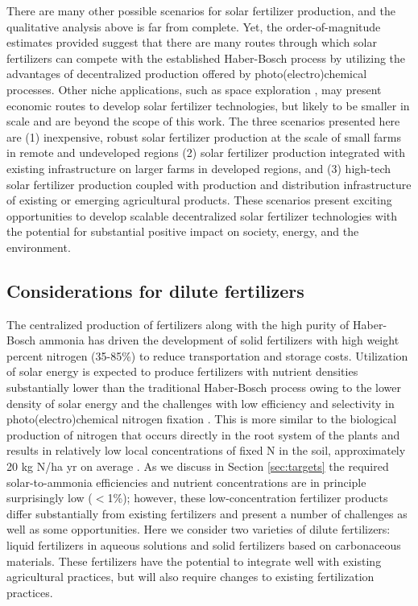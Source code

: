 There are many other possible scenarios for solar fertilizer production, and the qualitative analysis above is far from complete. Yet, the order-of-magnitude estimates provided suggest that there are many routes through which solar fertilizers can compete with the established Haber-Bosch process by utilizing the advantages of decentralized production offered by photo(electro)chemical processes. Other niche applications, such as space exploration \cite{Meyer_2016}, may present economic routes to develop solar fertilizer technologies, but likely to be smaller in scale and are beyond the scope of this work. The three scenarios presented here are (1) inexpensive, robust solar fertilizer production at the scale of small farms in remote and undeveloped regions (2) solar fertilizer production integrated with existing infrastructure on larger farms in developed regions, and (3) high-tech solar fertilizer production coupled with production and distribution infrastructure of existing or emerging agricultural products. These scenarios present exciting opportunities to develop scalable decentralized solar fertilizer technologies with the potential for substantial positive impact on society, energy, and the environment.


\subsection{Considerations for dilute fertilizers}
\label{sec:dilute}

The centralized production of fertilizers along with the high purity of Haber-Bosch ammonia has driven the development of solid fertilizers with high weight percent nitrogen (35-85\%) to reduce transportation and storage costs. 
Utilization of solar energy is expected to produce fertilizers with nutrient densities substantially lower than the traditional Haber-Bosch process owing to the lower density of solar energy \cite{MacKay_2013} and the challenges with low efficiency and selectivity in photo(electro)chemical nitrogen fixation \cite{Skulason_2012,Singh_2017}. This is more similar to the biological production of nitrogen that occurs directly in the root system of the plants and results in relatively low local concentrations of fixed N in the soil, approximately 20 kg N/ha yr on average \cite{Smil_1999_2}. As we discuss in Section \ref{sec:targets} the required solar-to-ammonia efficiencies and nutrient concentrations are in principle surprisingly low ($<$1\%); however, these low-concentration fertilizer products differ substantially from existing fertilizers and present a number of challenges as well as some opportunities. Here we consider two varieties of dilute fertilizers: liquid fertilizers in aqueous solutions and solid fertilizers based on carbonaceous materials. These fertilizers have the potential to integrate well with existing agricultural practices, but will also require changes to existing fertilization practices.

